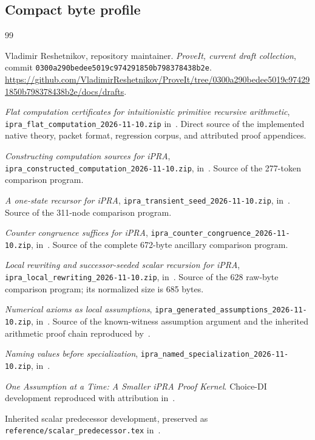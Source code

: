 \documentclass[11pt,letterpaper]{article}
\theoremstyle{definition}\newtheorem{definition}[theorem]{Definition}
\theoremstyle{remark}\newtheorem{remark}[theorem]{Remark}
\newcommand{\file}[1]{{\small\nolinkurl{#1}}}
\begin{document}
\subsection{Compact byte profile}

\clearpage
\begin{thebibliography}{99}
\raggedright
{}
Vladimir Reshetnikov, repository maintainer.
\emph{ProveIt, current draft collection}, commit
\file{0300a290bedee5019c974291850b798378438b2e}.
\url{https://github.com/VladimirReshetnikov/ProveIt/tree/0300a290bedee5019c974291850b798378438b2e/docs/drafts}.

\emph{Flat computation certificates for intuitionistic primitive
recursive arithmetic}, \file{ipra_flat_computation_2026-11-10.zip}
in~\cite{snapshot}. Direct source of the implemented native theory,
packet format, regression corpus, and attributed proof appendices.

\emph{Constructing computation sources for iPRA},
\file{ipra_constructed_computation_2026-11-10.zip}, in~\cite{snapshot}.
Source of the 277-token comparison program.

\emph{A one-state recursor for iPRA},
\file{ipra_transient_seed_2026-11-10.zip}, in~\cite{snapshot}.
Source of the 311-node comparison program.

\emph{Counter congruence suffices for iPRA},
\file{ipra_counter_congruence_2026-11-10.zip}, in~\cite{snapshot}.
Source of the complete 672-byte ancillary comparison program.

\emph{Local rewriting and successor-seeded scalar recursion for iPRA},
\file{ipra_local_rewriting_2026-11-10.zip}, in~\cite{snapshot}.
Source of the 628 raw-byte comparison program; its normalized size is 685 bytes.

\emph{Numerical axioms as local assumptions},
\file{ipra_generated_assumptions_2026-11-10.zip}, in~\cite{snapshot}.
Source of the known-witness assumption argument and the inherited
arithmetic proof chain reproduced by~\cite{flat}.

\emph{Naming values before specialization},
\file{ipra_named_specialization_2026-11-10.zip}, in~\cite{snapshot}.

\emph{One Assumption at a Time: A Smaller iPRA Proof Kernel}.
Choice-DI development reproduced with attribution in~\cite{named,generated,flat}.

Inherited scalar predecessor development, preserved as
\file{reference/scalar_predecessor.tex} in~\cite{flat}.


\end{thebibliography}
\end{document}
